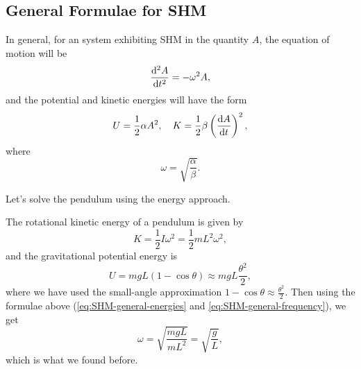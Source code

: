 \documentclass[../classical_mechanics.tex]{subfiles}
\begin{document}
        \subsection{General Formulae for SHM}\label{subsec:general-formula-for-SHM}
            In general, for an system exhibiting SHM in the quantity $A$, the equation of motion will be
            \begin{equation}
                \dv[2]{A}{t}=-\omega^2A,
            \end{equation}
            and the potential and kinetic energies will have the form
            \begin{equation}\label{eq:SHM-general-energies}
                U=\frac{1}{2}\alpha A^2,\quad K=\frac{1}{2}\beta\left(\dv{A}{t}\right)^2,
            \end{equation}
            where
            \begin{equation}\label{eq:SHM-general-frequency}
                \omega=\sqrt{\frac{\alpha}{\beta}}.
            \end{equation}
            \begin{example}
                Let's solve the pendulum using the energy approach.

                The rotational kinetic energy of a pendulum is given by
                \begin{equation}
                    K=\frac{1}{2}I\omega^2=\frac{1}{2}mL^2\omega^2,
                \end{equation}
                and the gravitational potential energy is
                \begin{equation}
                    U=mgL(1-\cos\theta)\approx mgL\frac{\theta^2}{2},
                \end{equation}
                where we have used the small-angle approximation $1-\cos\theta\approx\frac{\theta^2}{2}$.
                Then using the formulae above (\ref{eq:SHM-general-energies} and \ref{eq:SHM-general-frequency}), we get
                \begin{equation}
                    \omega=\sqrt{\frac{mgL}{mL^2}}=\sqrt{\frac{g}{L}},
                \end{equation}
                which is what we found before.
            \end{example}
        
\end{document}
